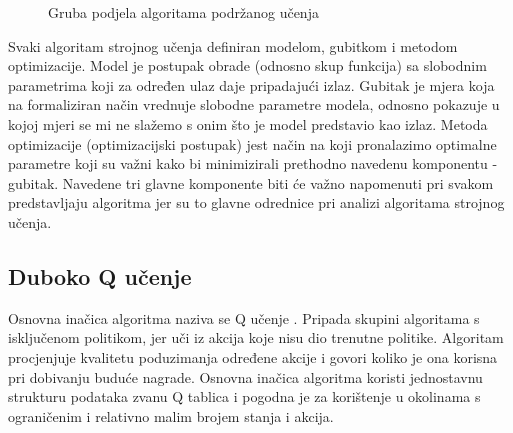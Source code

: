 
\begin{figure}[H]
    \centering
    \caption{Gruba podjela algoritama podržanog učenja \cite{RLAlgos}}
    \label{fig:rl-algorithms}
\end{figure}



Svaki algoritam strojnog učenja definiran modelom, gubitkom i metodom optimizacije. Model je postupak obrade (odnosno skup funkcija) sa slobodnim parametrima koji za određen ulaz daje pripadajući izlaz. Gubitak je mjera koja na formaliziran način vrednuje slobodne parametre modela, odnosno pokazuje u kojoj mjeri se mi ne slažemo s onim što je model predstavio kao izlaz. Metoda optimizacije (optimizacijski postupak) jest način na koji pronalazimo optimalne parametre koji su važni kako bi minimizirali prethodno navedenu komponentu - gubitak. Navedene tri glavne komponente biti će važno napomenuti pri svakom predstavljaju algoritma jer su to glavne odrednice pri analizi algoritama strojnog učenja.

\subsection{Duboko Q učenje}

Osnovna inačica algoritma naziva se Q učenje . Pripada skupini algoritama s isključenom politikom, jer uči iz akcija koje nisu dio trenutne politike. Algoritam procjenjuje kvalitetu  poduzimanja određene akcije i govori koliko je ona korisna pri dobivanju buduće nagrade. Osnovna inačica algoritma koristi jednostavnu strukturu podataka zvanu Q tablica  i pogodna je za korištenje u okolinama s ograničenim i relativno malim brojem stanja i akcija. 

